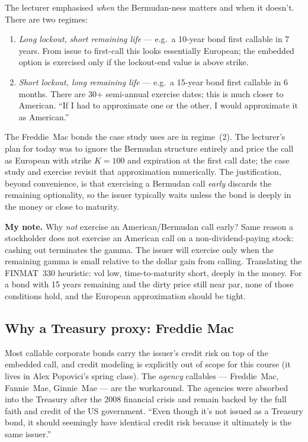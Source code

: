 The lecturer emphasised \emph{when} the Bermudan-ness matters and when
it doesn't. There are two regimes:
\begin{enumerate}[label=(\arabic*)]
  \item \emph{Long lockout, short remaining life} --- e.g.\ a 10-year
        bond first callable in 7 years. From issue to first-call this
        looks essentially European; the embedded option is exercised
        only if the lockout-end value is above strike.
  \item \emph{Short lockout, long remaining life} --- e.g.\ a 15-year
        bond first callable in 6 months. There are 30+ semi-annual
        exercise dates; this is much closer to American. ``If I had to
        approximate one or the other, I would approximate it as
        American.''
\end{enumerate}
The Freddie~Mac bonds the case study uses are in regime~(2). The
lecturer's plan for today was to ignore the Bermudan structure
entirely and price the call as European with strike $K=100$ and
expiration at the first call date; the case study and exercise revisit
that approximation numerically. The justification, beyond
convenience, is that exercising a Bermudan call \emph{early} discards
the remaining optionality, so the issuer typically waits unless the
bond is deeply in the money or close to maturity.

\begin{checkpoint}
\textbf{My note.} Why \emph{not} exercise an American/Bermudan call
early? Same reason a stockholder does not exercise an American call on
a non-dividend-paying stock: cashing out terminates the gamma. The
issuer will exercise only when the remaining gamma is small relative
to the dollar gain from calling. Translating the FINMAT~330
heuristic: vol low, time-to-maturity short, deeply in the money. For a
bond with 15 years remaining and the dirty price still near par, none
of those conditions hold, and the European approximation should be
tight.
\end{checkpoint}

\subsection{Why a Treasury proxy: Freddie Mac}\label{L5-sec:freddie}

Most callable corporate bonds carry the issuer's credit risk on top of
the embedded call, and credit modeling is explicitly out of scope for
this course (it lives in Alex Popovici's spring class). The
\emph{agency} callables --- Freddie~Mac, Fannie~Mae, Ginnie~Mae --- are
the workaround. The agencies were absorbed into the Treasury after the
2008 financial crisis and remain backed by the full faith and credit
of the US government. ``Even though it's not issued as a Treasury
bond, it should seemingly have identical credit risk because it
ultimately is the same issuer.''

